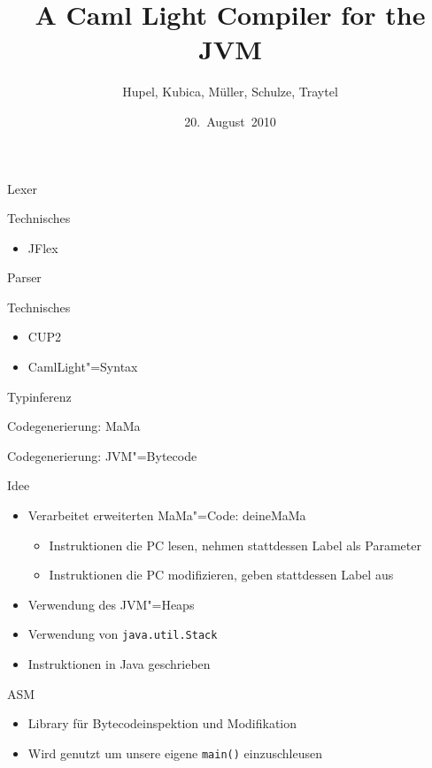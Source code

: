 \documentclass[hyperref={pdfpagelabels=false}]{beamer}
\title{A Caml Light Compiler for the JVM}
\author{Hupel, Kubica, Müller, Schulze, Traytel}
\institute{TU München}
\date{20.~August~2010}
\begin{document}
\frame{\titlepage}


\begin{frame}{Lexer}
  \begin{block}{Technisches}
    \begin{itemize}
      \item JFlex
    \end{itemize}
  \end{block}
\end{frame}

\begin{frame}{Parser}
  \begin{block}{Technisches}
    \begin{itemize}
      \item CUP2
      \item CamlLight"=Syntax
    \end{itemize}
  \end{block}
\end{frame}

\begin{frame}{Typinferenz}
\end{frame}

\begin{frame}{Codegenerierung: MaMa}
\end{frame}

\begin{frame}{Codegenerierung: JVM"=Bytecode}
  \begin{block}{Idee}
    \begin{itemize}
      \item Verarbeitet erweiterten MaMa"=Code: deineMaMa
        \begin{itemize}
          \item Instruktionen die PC lesen, nehmen stattdessen Label als Parameter
          \item Instruktionen die PC modifizieren, geben stattdessen Label aus
        \end{itemize}
      \item Verwendung des JVM"=Heaps
      \item Verwendung von \texttt{java.util.Stack}
      \item Instruktionen in Java geschrieben
    \end{itemize}
  \end{block}
  \begin{block}{ASM}
    \begin{itemize}
      \item Library für Bytecodeinspektion und Modifikation
      \item Wird genutzt um unsere eigene \texttt{main()} einzuschleusen
    \end{itemize}
  \end{block}
\end{frame}
\end{document}
